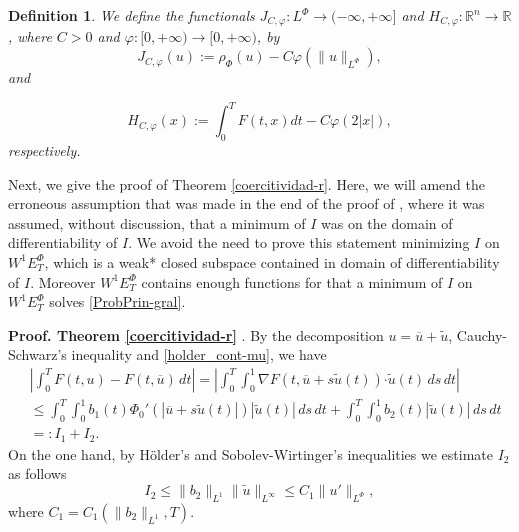 \documentclass[twoside]{article}
\newtheorem{defi}[thm]{Definition}
\theoremstyle{remark}
\newcommand{\orlnor}{\|_{L^{\Phi}}}
\newcommand{\lphi}{L^{\Phi}}
\newcommand{\ephi}{E^{\Phi}}
\newcommand{\wphiet}{W^{1}\ephi_T}
\renewcommand{\b}[1]{\boldsymbol{#1}}
\newcommand{\rr}{\mathbb{R}}
\newcommand{\ccdot}{\b{\cdot}}
\renewcommand{\leq}{\leqslant}
\begin{document}
\begin{defi}We define the  functionals $J_{C,\varphi}:\lphi\to (-\infty,+\infty]$ and $  H_{C,\varphi}:\rr^n\to \rr$, where $C>0$ and $\varphi:[0,+\infty)\to [0,+\infty)$, by
\begin{equation}\label{func_phi}
  J_{C,\varphi}(u):= \rho_{\Phi}\left(u\right)-C\varphi\left(\|u\orlnor\right),
\end{equation}
 and

\begin{equation}\label{eq:functional_H-bis}
 H_{C,\varphi}(x):=\int_0^TF(t,x)dt-C\varphi(2|x|),
\end{equation}
respectively.
\end{defi}



Next, we give the proof of Theorem \ref{coercitividad-r}.  Here,  we will amend the
erroneous assumption that was made in the end of the proof of  \cite[Thm. 6.2]{ABGMS2015},  where it was assumed, without discussion, that  a minimum of  $I$ was on the domain of differentiability of $I$. We avoid  the need to prove this statement minimizing $I$ on $\wphiet$, which is a weak* closed subspace  contained in domain of differentiability of $I$. Moreover $\wphiet$ contains enough functions for that a minimum of $I$ on $\wphiet$ solves \eqref{ProbPrin-gral}.
\vspace{.4cm}

\noindent\textbf{Proof. Theorem \ref{coercitividad-r} }. By the decomposition $u=\overline{u}+\tilde{u}$,   Cauchy-Schwarz's inequality
and \eqref{holder_cont-mu}, we have
\begin{equation}\label{cota-diferencia-F}
\begin{split}
&\left|\int_0^T F(t,u)-F(t,\overline{u})\,dt\right|=
\left|\int_0^T \int_0^1 \nabla F(t,\overline{u}+s\tilde{u}(t))\ccdot \tilde{u}(t) \,ds \,dt\right|
\\
&\leq \int_0^T \int_0^1 b_1(t)\Phi_0'(|\overline{u}+s\tilde{u}(t)|)|\tilde{u}(t)|\,ds\,dt+
\int_0^T \int_0^1 b_2(t)|\tilde{u}(t)|\,ds\,dt
\\
&=:I_1+I_2.
\end{split}
\end{equation}
On the one hand, by H\"older's and Sobolev-Wirtinger's inequalities we estimate $I_2$ as follows
\begin{equation}\label{cota-i2}
I_2\leq \|b_2\|_{L^1} \|\tilde{u}\|_{L^{\infty}}\leq
C_1\|u'\orlnor,
\end{equation}
 where $C_1=C_1(\|b_2\|_{L^1}, T)$. 
\end{document}
